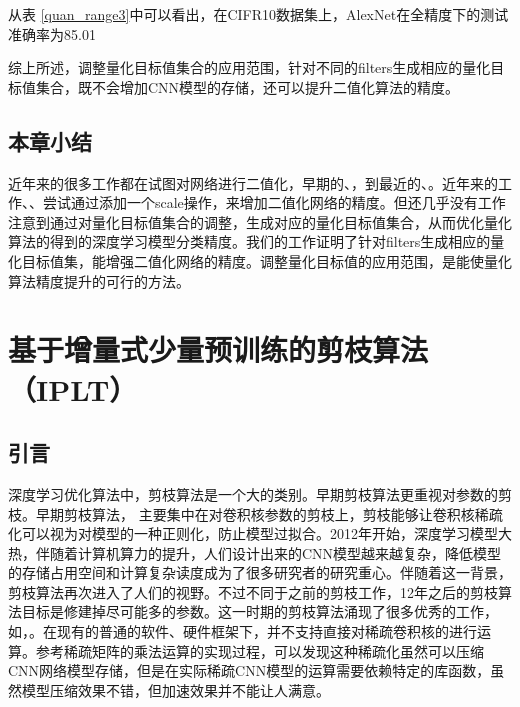 \documentclass[ pdftex, oneside, master]{NJUthesis}
\begin{document}
从表 \ref{quan_range3}中可以看出，在CIFR10数据集上，AlexNet在全精度下的测试准确率为85.01%

综上所述，调整量化目标值集合的应用范围，针对不同的filters生成相应的量化目标值集合，既不会增加CNN模型的存储，还可以提升二值化算法的精度。

\section{本章小结}

近年来的很多工作都在试图对网络进行二值化，早期的\cite{binary}、\cite{binary1}，到最近的\cite{extremely}、\cite{18bianry}。近年来的工作\cite{extremely}、\cite{18bianry}、\cite{cvprq71}尝试通过添加一个scale操作，来增加二值化网络的精度。但还几乎没有工作注意到通过对量化目标值集合的调整，生成对应的量化目标值集合，从而优化量化算法的得到的深度学习模型分类精度。我们的工作证明了针对filters生成相应的量化目标值集，能增强二值化网络的精度。调整量化目标值的应用范围，是能使量化算法精度提升的可行的方法。




\chapter{基于增量式少量预训练的剪枝算法（IPLT）}

\section{引言}

深度学习优化算法中，剪枝算法是一个大的类别。早期剪枝算法更重视对参数的剪枝。早期剪枝算法\cite{90prune}， \cite{92prune}主要集中在对卷积核参数的剪枝上，剪枝能够让卷积核稀疏化可以视为对模型的一种正则化，防止模型过拟合。2012年开始，深度学习模型大热，伴随着计算机算力的提升，人们设计出来的CNN模型越来越复杂，降低模型的存储占用空间和计算复杂读度成为了很多研究者的研究重心。伴随着这一背景，剪枝算法再次进入了人们的视野。不过不同于之前的剪枝工作，12年之后的剪枝算法目标是修建掉尽可能多的参数。这一时期的剪枝算法涌现了很多优秀的工作，如\cite{11}，\cite{12}。在现有的普通的软件、硬件框架下，并不支持直接对稀疏卷积核的进行运算。参考稀疏矩阵的乘法运算的实现过程，可以发现这种稀疏化虽然可以压缩CNN网络模型存储，但是在实际稀疏CNN模型的运算需要依赖特定的库函数，虽然模型压缩效果不错，但加速效果并不能让人满意。
\end{document}
